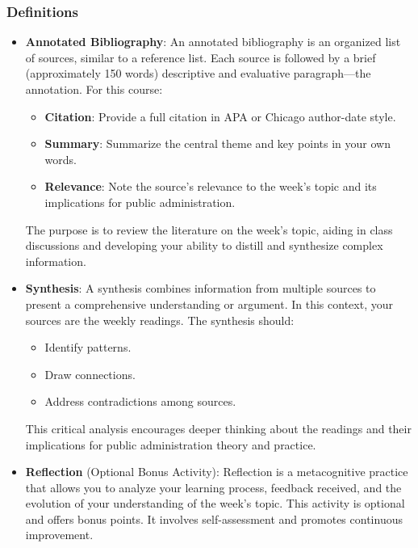 \documentclass[12pt, letterpaper]{article}
\begin{document}
\subsubsection*{Definitions}
\begin{itemize}
\item \textbf{Annotated Bibliography}: An annotated bibliography is an organized list of sources, similar to a reference list. Each source is followed by a brief (approximately 150 words) descriptive and evaluative paragraph—the annotation. For this course:

\begin{itemize}
    \item \textbf{Citation}: Provide a full citation in APA or Chicago author-date style.
    \item \textbf{Summary}: Summarize the central theme and key points in your own words.
    \item \textbf{Relevance}: Note the source's relevance to the week's topic and its implications for public administration.
\end{itemize}

\noindent The purpose is to review the literature on the week's topic, aiding in class discussions and developing your ability to distill and synthesize complex information.

\item \textbf{Synthesis}: A synthesis combines information from multiple sources to present a comprehensive understanding or argument. In this context, your sources are the weekly readings. The synthesis should:

\begin{itemize}
    \item Identify patterns.
    \item Draw connections.
    \item Address contradictions among sources.
\end{itemize}

\noindent This critical analysis encourages deeper thinking about the readings and their implications for public administration theory and practice.

\item \textbf{Reflection} (Optional Bonus Activity): Reflection is a metacognitive practice that allows you to analyze your learning process, feedback received, and the evolution of your understanding of the week's topic. This activity is optional and offers bonus points. It involves self-assessment and promotes continuous improvement.

\end{itemize}
\end{document}
